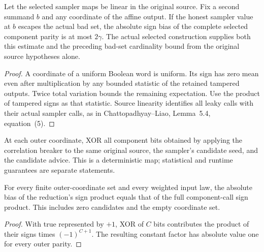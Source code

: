 \begin{theorem}
  \label{thm:lowerbounds-algebraic-affine-leakage-parity}
  \leanok
  Let the selected sampler maps be linear in the original source.
  Fix a second summand $b$ and any coordinate of the affine output.
  If the honest sampler value at $b$ escapes the actual bad set, the
  absolute sign bias of the complete selected component parity is at
  most $2\gamma$. The actual selected construction supplies both this
  estimate and the preceding bad-set cardinality bound from the
  original source hypotheses alone.
\end{theorem}
\begin{proof}
  \leanok
  A coordinate of a uniform Boolean word is uniform. Its sign has zero
  mean even after multiplication by any bounded statistic of the
  retained tampered outputs. Twice total variation bounds the remaining
  expectation. Use the product of tampered signs as that statistic.
  Source linearity identifies all leaky calls with their actual sampler
  calls, as in Chattopadhyay--Liao, Lemma~5.4, equation~(5).
\end{proof}

\begin{definition}
  \label{def:lowerbounds-algebraic-affine-source-reduction}
  \leanok
  At each outer coordinate, XOR all component bits obtained by applying
  the correlation breaker to the same original source, the sampler's
  candidate seed, and the candidate advice. This is a deterministic map;
  statistical and runtime guarantees are separate statements.
\end{definition}

\begin{theorem}
  \label{thm:lowerbounds-algebraic-affine-source-reduction-parity}
  \leanok
  For every finite outer-coordinate set and every weighted input law,
  the absolute bias of the reduction's sign product equals that of the
  full component-call sign product. This includes zero candidates and
  the empty coordinate set.
\end{theorem}
\begin{proof}
  \leanok
  With true represented by $+1$, XOR of $C$ bits contributes the
  product of their signs times $(-1)^{C+1}$. The resulting constant
  factor has absolute value one for every outer parity.
\end{proof}

